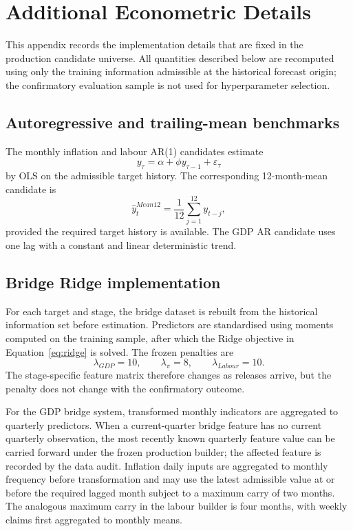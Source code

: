 \section{Additional Econometric Details}
\label{app:econometrics}

This appendix records the implementation details that are fixed in the
production candidate universe. All quantities described below are recomputed
using only the training information admissible at the historical forecast
origin; the confirmatory evaluation sample is not used for hyperparameter
selection.

\subsection{Autoregressive and trailing-mean benchmarks}

The monthly inflation and labour AR(1) candidates estimate
\[
    y_\tau=\alpha+\phi y_{\tau-1}+\varepsilon_\tau
\]
by OLS on the admissible target history. The corresponding 12-month-mean
candidate is
\[
    \widehat y_{t}^{Mean12}
    =
    \frac{1}{12}\sum_{j=1}^{12} y_{t-j},
\]
provided the required target history is available. The GDP AR candidate uses
one lag with a constant and linear deterministic trend.

\subsection{Bridge Ridge implementation}

For each target and stage, the bridge dataset is rebuilt from the historical
information set before estimation. Predictors are standardised using moments
computed on the training sample, after which the Ridge objective in
Equation~\eqref{eq:ridge} is solved. The frozen penalties are
\[
    \lambda_{GDP}=10,\qquad
    \lambda_{\pi}=8,\qquad
    \lambda_{Labour}=10.
\]
The stage-specific feature matrix therefore changes as releases arrive, but
the penalty does not change with the confirmatory outcome.

For the GDP bridge system, transformed monthly indicators are aggregated to
quarterly predictors. When a current-quarter bridge feature has no current
quarterly observation, the most recently known quarterly feature value can be
carried forward under the frozen production builder; the affected feature is
recorded by the data audit. Inflation daily inputs are aggregated to monthly
frequency before transformation and may use the latest admissible value at or
before the required lagged month subject to a maximum carry of two months.
The analogous maximum carry in the labour builder is four months, with weekly
claims first aggregated to monthly means.

